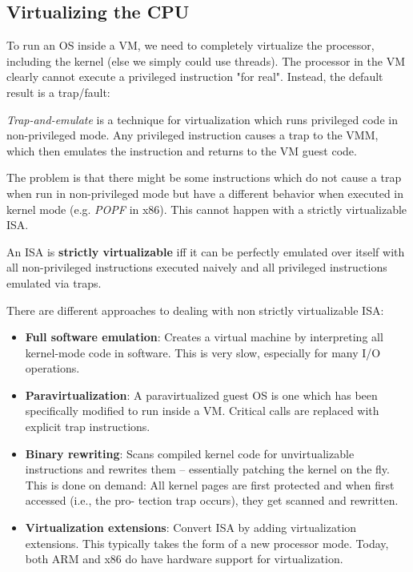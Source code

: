 \subsection{Virtualizing the CPU}

To run an OS inside a VM, we need to completely virtualize the processor, including the kernel (else we simply could use threads). The processor in the VM clearly cannot execute a privileged instruction "for real". Instead, the default result is a trap/fault: \medskip

\textit{Trap-and-emulate} is a technique for virtualization which runs privileged code in non-privileged mode. Any privileged instruction causes a trap to the VMM, which then emulates the instruction and returns to the VM guest code.\medskip

The problem is that there might be some instructions which do not cause a trap when run in non-privileged mode but have a different behavior when executed in kernel mode (e.g. \textit{POPF} in x86). This cannot happen with a strictly virtualizable ISA. \medskip

An ISA is \textbf{strictly virtualizable} iff it can be perfectly emulated over itself with all non-privileged instructions executed naively and all privileged instructions emulated via traps. \medskip

There are different approaches to dealing with non strictly virtualizable ISA:
\begin{itemize}
	\item \textbf{Full software emulation}: Creates a virtual machine by interpreting all kernel-mode code in software. This is very slow, especially for many I/O operations.
	\item \textbf{Paravirtualization}: A paravirtualized guest OS is one which has been specifically modified to run inside a VM. Critical calls are replaced with explicit trap instructions.
	\item \textbf{Binary rewriting}: Scans compiled kernel code for unvirtualizable instructions and rewrites them – essentially patching the kernel on the fly. This is done on demand: All kernel pages are first protected and when first accessed (i.e., the pro- tection trap occurs), they get scanned and rewritten.	
	\item \textbf{Virtualization extensions}: Convert ISA by adding virtualization extensions. This typically takes the form of a new processor mode. Today, both ARM and x86 do have hardware support for virtualization.
\end{itemize}


